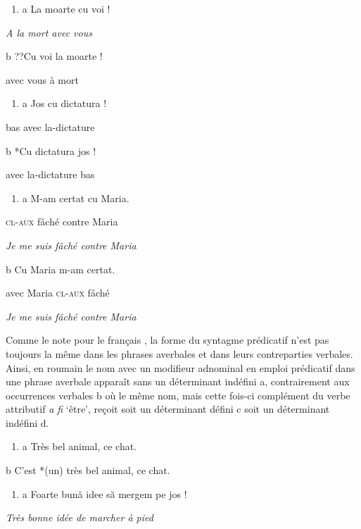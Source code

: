 \begin{enumerate}
\item \label{bkm:Ref283990500}a  La moarte cu voi !


\end{enumerate}
{\itshape
A la mort avec vous}

b  ??Cu  voi  la  moarte !

  avec  vous  à  mort 


\begin{enumerate}
\item \label{bkm:Ref283990504}a  Jos  cu  dictatura !


\end{enumerate}
bas  avec  la-dictature

b  *Cu  dictatura  jos !

  avec  la-dictature  bas


\begin{enumerate}
\item \label{bkm:Ref302651444}a  M-am certat cu Maria.


\end{enumerate}
\textsc{cl-aux} fâché contre Maria

{\itshape
Je me suis fâché contre Maria}

b  Cu Maria m-am certat.

  avec Maria \textsc{cl-aux} fâché

    \textit{Je me suis fâché contre Maria}

Comme le note \citet{Laurens2008} pour le français , la forme du syntagme prédicatif n'est pas toujours la même dans les phrases averbales et dans leurs contreparties verbales. Ainsi, en roumain le nom avec un modifieur adnominal en emploi prédicatif dans une phrase averbale apparaît sans un déterminant indéfini a, contrairement aux occurrences verbales b où le même nom, mais cette fois-ci complément du verbe attributif \textit{a fi} `être', reçoit soit un déterminant défini c soit un déterminant indéfini d.


\begin{enumerate}
\item \label{bkm:Ref302651020}a  Très bel animal, ce chat.  


\end{enumerate}
b  C'est *(un) très bel animal, ce chat.


\begin{enumerate}
\item \label{bkm:Ref283990465}a  Foarte bună idee să mergem pe jos ! 


\end{enumerate}
{\itshape
Très bonne idée de marcher à pied}

